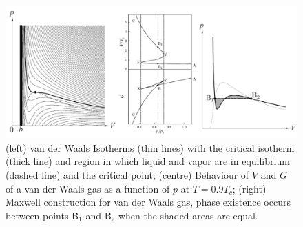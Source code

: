 \documentclass[a4paper]{article}
\theoremstyle{new}
\begin{document}
\begin{figure}[H]
    \centering
    \includegraphics[width=\linewidth]{vanderwaals.PNG}
    \caption{(left) van der Waals Isotherms (thin lines) with the critical isotherm (thick line) and region in which liquid and vapor are in equilibrium (dashed line) and the critical point; (centre) Behaviour of $V$ and $G$ of a van der Waals gas as a function of $p$ at $T=0.9T_c$; (right) Maxwell construction for van der Waals gas, phase existence occurs between points B$_1$ and B$_2$ when the shaded areas are equal.}
    \label{vanderwaals}
\end{figure}
\newpage
\end{document}
